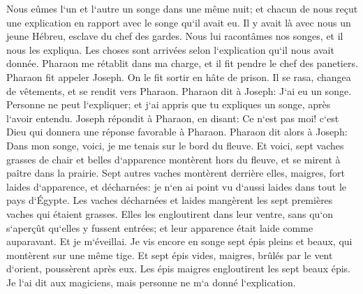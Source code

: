 \verse Nous eûmes l`un et l`autre un songe dans une même nuit; et chacun de nous reçut une explication en rapport avec le songe qu`il avait eu. 
\verse Il y avait là avec nous un jeune Hébreu, esclave du chef des gardes. Nous lui racontâmes nos songes, et il nous les expliqua. 
\verse Les choses sont arrivées selon l`explication qu`il nous avait donnée. Pharaon me rétablit dans ma charge, et il fit pendre le chef des panetiers. 
\verse Pharaon fit appeler Joseph. On le fit sortir en hâte de prison. Il se rasa, changea de vêtements, et se rendit vers Pharaon. 
\verse Pharaon dit à Joseph: J`ai eu un songe. Personne ne peut l`expliquer; et j`ai appris que tu expliques un songe, après l`avoir entendu. 
\verse Joseph répondit à Pharaon, en disant: Ce n`est pas moi! c`est Dieu qui donnera une réponse favorable à Pharaon. 
\verse Pharaon dit alors à Joseph: Dans mon songe, voici, je me tenais sur le bord du fleuve. 
\verse Et voici, sept vaches grasses de chair et belles d`apparence montèrent hors du fleuve, et se mirent à paître dans la prairie. 
\verse Sept autres vaches montèrent derrière elles, maigres, fort laides d`apparence, et décharnées: je n`en ai point vu d`aussi laides dans tout le pays d`Égypte. 
\verse Les vaches décharnées et laides mangèrent les sept premières vaches qui étaient grasses. 
\verse Elles les engloutirent dans leur ventre, sans qu`on s`aperçût qu`elles y fussent entrées; et leur apparence était laide comme auparavant. Et je m`éveillai. 
\verse Je vis encore en songe sept épis pleins et beaux, qui montèrent sur une même tige. 
\verse Et sept épis vides, maigres, brûlés par le vent d`orient, poussèrent après eux. 
\verse Les épis maigres engloutirent les sept beaux épis. Je l`ai dit aux magiciens, mais personne ne m`a donné l`explication. 
